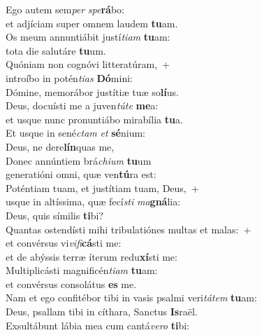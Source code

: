 \evenverse Ego autem sem\textit{per} \textit{spe}\textbf{rá}bo:~\*\\
\evenverse et adjíciam super omnem laudem \textbf{tu}am.\\
\oddverse Os meum annuntiábit justí\textit{ti}\textit{am} \textbf{tu}am:~\*\\
\oddverse tota die salutáre \textbf{tu}um.\\
\evenverse Quóniam non cognóvi litteratúram,~+\\
\evenverse  introíbo in potén\textit{ti}\textit{as} \textbf{Dó}mini:~\*\\
\evenverse Dómine, memorábor justítiæ tuæ so\textbf{lí}us.\\
\oddverse Deus, docuísti me a juven\textit{tú}\textit{te} \textbf{me}a:~\*\\
\oddverse et usque nunc pronuntiábo mirabília \textbf{tu}a.\\
\evenverse Et usque in sené\textit{ctam} \textit{et} \textbf{sé}nium:~\*\\
\evenverse Deus, ne dere\textbf{lín}quas me,\\
\oddverse Donec annúntiem brá\textit{chi}\textit{um} \textbf{tu}um~\*\\
\oddverse generatióni omni, quæ ven\textbf{tú}ra est:\\
\evenverse Poténtiam tuam, et justítiam tuam, Deus,~+\\
\evenverse  usque in altíssima, quæ fecí\textit{sti} \textit{ma}\textbf{gná}lia:~\*\\
\evenverse Deus, quis símilis \textbf{ti}bi?\\
\oddverse Quantas ostendísti mihi tribulatiónes multas et malas:~+\\
\oddverse  et convérsus vi\textit{vi}\textit{fi}\textbf{cá}sti me:~\*\\
\oddverse et de abýssis terræ íterum redu\textbf{xí}sti me:\\
\evenverse Multiplicásti magnificén\textit{ti}\textit{am} \textbf{tu}am:~\*\\
\evenverse et convérsus consolátus \textbf{es} me.\\
\oddverse Nam et ego confitébor tibi in vasis psalmi veri\textit{tá}\textit{tem} \textbf{tu}am:~\*\\
\oddverse Deus, psallam tibi in cíthara, Sanctus \textbf{Is}raël.\\
\evenverse Exsultábunt lábia mea cum cantá\textit{ve}\textit{ro} \textbf{ti}bi:~\*\\

